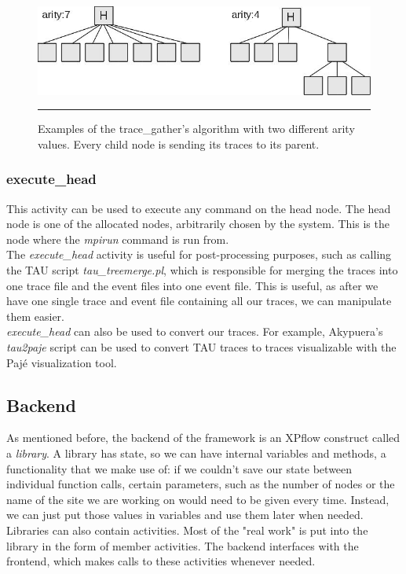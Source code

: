 \begin{figure}[htbp]
  \centering
    \includegraphics[scale=0.6]{./Figures/tracegather_arity.jpg}
    \rule{35em}{0.5pt}
  \caption[Arity in trace\_gather]{Examples of the trace\_gather's
    algorithm with two different arity values. Every child node is
    sending its traces to its parent.}
  \label{fig:tracegather_arity}
\end{figure}

\subsubsection{execute\_head}
This activity can be used to execute any command on the head node. The
head node is one of the allocated nodes, arbitrarily chosen by the
system. This is the node where the \emph{mpirun} command is run
from.\\
The \emph{execute\_head} activity is useful for post-processing
purposes, such as calling the TAU\cite{sm06} script
\emph{tau\_treemerge.pl}, which is responsible for merging the traces
into one trace file and the event files into one event file. This is
useful, as after we have one single trace and event file containing
all our traces, we can manipulate them easier.\\
\emph{execute\_head} can also be used to convert our traces. For
example, Akypuera's\cite{s13} \emph{tau2paje} script can be used to
convert TAU traces to traces visualizable with the Pajé\cite{cob00}
visualization tool.
\subsection{Backend}
As mentioned before, the backend of the framework is an XPflow
construct called a \emph{library}. A library has state, so we can have
internal variables and methods, a functionality that we make use of:
if we couldn't save our state between individual function calls,
certain parameters, such as the number of nodes or the name of the
site we are working on would need to be given every time. Instead, we
can just put those values in variables and use them later when
needed.\\
Libraries can also contain activities. Most of the "real work" is put
into the library in the form of member activities. The backend
interfaces with the frontend, which makes calls to these activities
whenever needed.
